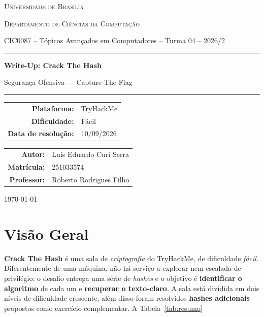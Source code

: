 \documentclass[12pt,a4paper]{article}
\newcommand{\desafioNome}{Crack The Hash}
\newcommand{\plataforma}{TryHackMe}
\newcommand{\dificuldade}{Fácil}
\newcommand{\dataResolucao}{10/09/2026}
\newcommand{\autorNome}{Luís Eduardo Curi Serra}
\newcommand{\materia}{CIC0087 -- Tópicos Avançados em Computadores -- Turma 04 -- 2026/2}
\newcommand{\departamento}{Departamento de Ciências da Computação}
\newcommand{\matricula}{251033574}
\newcommand{\professor}{Roberto Rodrigues Filho}
\newcommand{\universidade}{Universidade de Brasília}
\begin{document}
\begin{titlepage}
  \thispagestyle{empty}
  \centering
  {\scshape \universidade \par}
  {\scshape \departamento \par}
  \vspace{0.4cm}
  {\small \materia \par}
  \vspace{2.5cm}

  \rule{\linewidth}{0.4pt}\par
  \vspace{0.6cm}
  {\huge \bfseries Write-Up: \desafioNome \par}
  \vspace{0.4cm}
  {\large Segurança Ofensiva --- Capture The Flag \par}
  \vspace{0.6cm}
  \rule{\linewidth}{0.4pt}\par

  \vspace{2.0cm}
  \begin{tabular}{rl}
    \textbf{Plataforma:}       & \plataforma       \\[4pt]
    \textbf{Dificuldade:}      & \dificuldade      \\[4pt]
    \textbf{Data de resolução:}& \dataResolucao    \\
  \end{tabular}

  \vfill

  \begin{tabular}{rl}
    \textbf{Autor:}     & \autorNome  \\[4pt]
    \textbf{Matrícula:} & \matricula  \\[4pt]
    \textbf{Professor:} & \professor  \\
  \end{tabular}

  \vspace{1.2cm}
  {\small \today \par}
\end{titlepage}

\newpage
\tableofcontents
\thispagestyle{fancy}
\newpage

\section{Visão Geral}
\textbf{Crack The Hash} é uma sala de \emph{criptografia} do TryHackMe, de
dificuldade \emph{fácil}. Diferentemente de uma máquina, não há serviço a
explorar nem escalada de privilégio: o desafio entrega uma série de \emph{hashes}
e o objetivo é \textbf{identificar o algoritmo} de cada um e \textbf{recuperar o
texto-claro}. A sala está dividida em dois níveis de dificuldade crescente, além
disso foram resolvidos \textbf{hashes adicionais} propostos como exercício complementar. A Tabela~\ref{tab:resumo}
\end{document}
